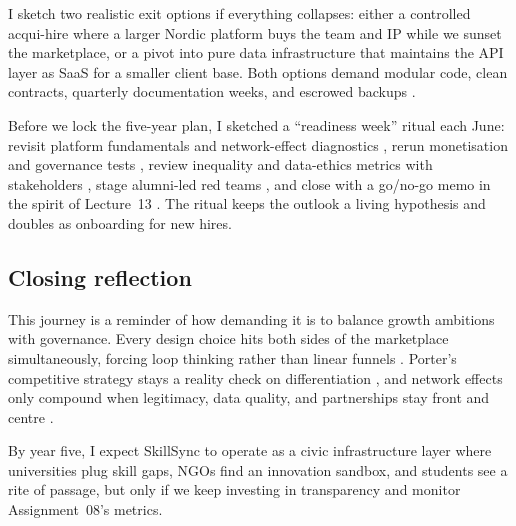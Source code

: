 I sketch two realistic exit options if everything collapses: either a controlled acqui-hire where a larger Nordic platform buys the team and IP while we sunset the marketplace, or a pivot into pure data infrastructure that maintains the API layer as SaaS for a smaller client base. Both options demand modular code, clean contracts, quarterly documentation weeks, and escrowed backups \citep{Reillier2017}.

Before we lock the five-year plan, I sketched a ``readiness week'' ritual each June: revisit platform fundamentals and network-effect diagnostics \citep{Lecture01,Lecture02}, rerun monetisation and governance tests \citep{Lecture05,Lecture10}, review inequality and data-ethics metrics with stakeholders \citep{Lecture08,Lecture11}, stage alumni-led red teams \citep{Lecture12}, and close with a go/no-go memo in the spirit of Lecture~13 \citep{Lecture13}. The ritual keeps the outlook a living hypothesis and doubles as onboarding for new hires.

\subsection*{Closing reflection}
This journey is a reminder of how demanding it is to balance growth ambitions with governance. Every design choice hits both sides of the marketplace simultaneously, forcing loop thinking rather than linear funnels \citep{Choudary2016}. Porter’s competitive strategy stays a reality check on differentiation \citep{Porter2008}, and network effects only compound when legitimacy, data quality, and partnerships stay front and centre \citep{Srnicek2017}.

By year five, I expect SkillSync to operate as a civic infrastructure layer where universities plug skill gaps, NGOs find an innovation sandbox, and students see a rite of passage, but only if we keep investing in transparency and monitor Assignment~08's metrics.

